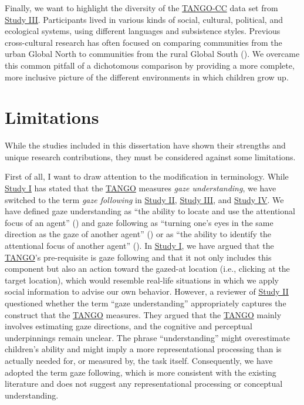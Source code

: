 \documentclass[
]{scrbook}
\begin{document}
Finally, we want to highlight the diversity of the \hyperref[acronyms_TANGO-CC]{TANGO-CC} data set from \hyperref[studyIII]{Study III}. Participants lived in various kinds of social, cultural, political, and ecological systems, using different languages and subsistence styles. Previous cross-cultural research has often focused on comparing communities from the urban Global North to communities from the rural Global South (). We overcame this common pitfall of a dichotomous comparison by providing a more complete, more inclusive picture of the different environments in which children grow up.

\section{Limitations}\label{limitations}

While the studies included in this dissertation have shown their strengths and unique research contributions, they must be considered against some limitations.

First of all, I want to draw attention to the modification in terminology. While \hyperref[studyI]{Study I} has stated that the \hyperref[acronyms_TANGO]{TANGO} measures \emph{gaze understanding}, we have switched to the term \emph{gaze following} in \hyperref[studyII]{Study II}, \hyperref[studyIII]{Study III}, and \hyperref[studyIV]{Study IV}. We have defined gaze understanding as ``the ability to locate and use the attentional focus of an agent'' () and gaze following as ``turning one's eyes in the same direction as the gaze of another agent'' () or as ``the ability to identify the attentional focus of another agent'' (). In \hyperref[studyI]{Study I}, we have argued that the \hyperref[acronyms_TANGO]{TANGO}'s pre-requisite is gaze following and that it not only includes this component but also an action toward the gazed-at location (i.e., clicking at the target location), which would resemble real-life situations in which we apply social information to advise our own behavior. However, a reviewer of \hyperref[studyII]{Study II} questioned whether the term ``gaze understanding'' appropriately captures the construct that the \hyperref[acronyms_TANGO]{TANGO} measures. They argued that the \hyperref[acronyms_TANGO]{TANGO} mainly involves estimating gaze directions, and the cognitive and perceptual underpinnings remain unclear. The phrase ``understanding'' might overestimate children's ability and might imply a more representational processing than is actually needed for, or measured by, the task itself. Consequently, we have adopted the term gaze following, which is more consistent with the existing literature and does not suggest any representational processing or conceptual understanding.
\end{document}

